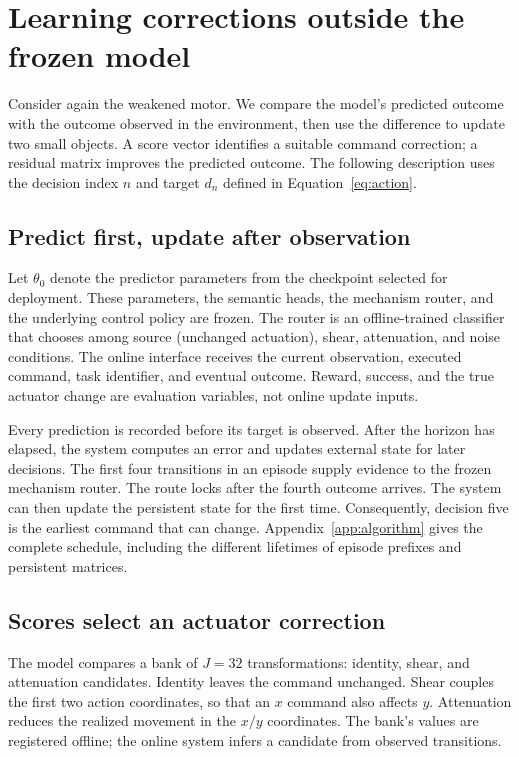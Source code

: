 \section{Learning corrections outside the frozen model}
\label{sec:adapt}
Consider again the weakened motor. We compare the model's predicted outcome
with the outcome observed in the environment, then use the difference to
update two small objects. A score vector identifies a suitable command
correction; a residual matrix improves the predicted outcome. The following description uses
the decision index $n$ and target $d_n$ defined in Equation~\eqref{eq:action}.

\subsection{Predict first, update after observation}
Let $\theta_0$ denote the predictor parameters from the checkpoint selected for
deployment. These parameters, the semantic heads, the mechanism router, and
the underlying control policy are frozen. The router is an offline-trained
classifier that chooses among source (unchanged actuation), shear, attenuation,
and noise conditions. The online interface
receives the current observation, executed command, task identifier, and eventual
outcome. Reward, success, and the true actuator change are evaluation variables,
not online update inputs.

Every prediction is recorded before its target is observed. After the horizon
has elapsed, the system computes an error and updates external state for later
decisions. The first four transitions in an episode supply evidence to the
frozen mechanism router. The route locks after the fourth outcome arrives. The system can then update
the persistent state for the first time. Consequently, decision five is
the earliest command that can change. Appendix~\ref{app:algorithm} gives the
complete schedule, including the different lifetimes of episode prefixes and
persistent matrices.

\subsection{Scores select an actuator correction}
The model compares a bank of $J=32$ transformations: identity, shear, and
attenuation candidates. Identity leaves the command unchanged. Shear couples
the first two action coordinates, so that an $x$ command also affects $y$.
Attenuation reduces the realized movement in the $x/y$ coordinates. The bank's
values are registered offline; the online system infers a candidate from
observed transitions.

